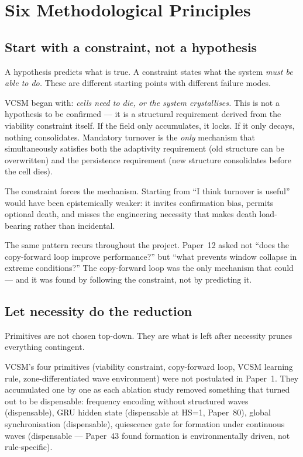 \documentclass[11pt,a4paper]{article}
\begin{document}
\section{Six Methodological Principles}

\subsection{Start with a constraint, not a hypothesis}

A hypothesis predicts what is true.
A constraint states what the system \emph{must be able to do.}
These are different starting points with different failure modes.

VCSM began with: \emph{cells need to die, or the system crystallises.}
This is not a hypothesis to be confirmed --- it is a structural requirement
derived from the viability constraint itself.
If the field only accumulates, it locks.
If it only decays, nothing consolidates.
Mandatory turnover is the \emph{only} mechanism that simultaneously satisfies
both the adaptivity requirement (old structure can be overwritten) and
the persistence requirement (new structure consolidates before the cell dies).

The constraint forces the mechanism.
Starting from ``I think turnover is useful'' would have been epistemically weaker:
it invites confirmation bias, permits optional death, and misses the
engineering necessity that makes death load-bearing rather than incidental.

The same pattern recurs throughout the project.
Paper~12 asked not ``does the copy-forward loop improve performance?''
but ``what prevents window collapse in extreme conditions?''
The copy-forward loop was the only mechanism that could --- and it was found
by following the constraint, not by predicting it.

\subsection{Let necessity do the reduction}

Primitives are not chosen top-down.
They are what is left after necessity prunes everything contingent.

VCSM's four primitives (viability constraint, copy-forward loop,
VCSM learning rule, zone-differentiated wave environment) were not
postulated in Paper~1.
They accumulated one by one as each ablation study removed something
that turned out to be dispensable:
frequency encoding without structured waves (dispensable),
GRU hidden state (dispensable at HS=1, Paper~80),
global synchronisation (dispensable),
quiescence gate for formation under continuous waves
(dispensable --- Paper~43 found formation is environmentally driven, not rule-specific).
\end{document}
